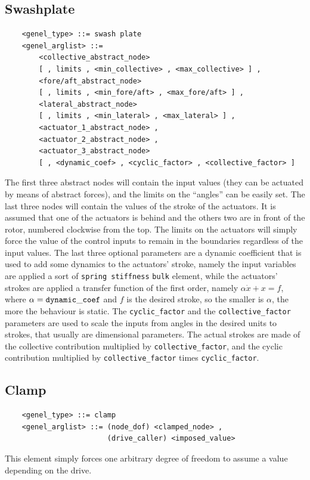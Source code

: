 \documentclass[10pt,dvips]{report}
\begin{document}
\subsection{Swashplate}
\begin{verbatim}
    <genel_type> ::= swash plate
    <genel_arglist> ::=
        <collective_abstract_node> 
        [ , limits , <min_collective> , <max_collective> ] ,
        <fore/aft_abstract_node> 
        [ , limits , <min_fore/aft> , <max_fore/aft> ] ,
        <lateral_abstract_node> 
        [ , limits , <min_lateral> , <max_lateral> ] ,
        <actuator_1_abstract_node> ,
        <actuator_2_abstract_node> ,
        <actuator_3_abstract_node> 
        [ , <dynamic_coef> , <cyclic_factor> , <collective_factor> ]
\end{verbatim}
The first three abstract nodes will contain the input values (they can be
actuated by means of abstract forces), and the limits on the ``angles'' can
be easily set. 
The last three nodes will contain the values of the stroke of the actuators.
It is assumed that one of the actuators is behind and the others two are in
front of the rotor, numbered clockwise from the top. 
The limits on the actuators will simply force the value of the control
inputs to remain in the boundaries regardless of the input values.
The last three optional parameters are a dynamic coefficient that is used to
add some dynamics to the actuators' stroke, namely the input variables are
applied a sort of {\tt spring stiffness} {\tt bulk} element, while the
actuators' strokes are applied a transfer function of the first order, namely
$ \alpha\dot{x}+x=f $, where $ \alpha={\tt dynamic\_coef} $ and $ f $ is
the desired stroke, so the smaller is $ \alpha $, the more the behaviour is
static.
The {\tt cyclic\_factor} and the {\tt collective\_factor} parameters are
used to scale the inputs from angles in the desired units to strokes, that
usually are dimensional parameters. The actual strokes are made of the
collective contribution multiplied by {\tt collective\_factor}, and the
cyclic contribution multiplied by {\tt collective\_factor} times 
{\tt cyclic\_factor}.
   
\subsection{Clamp}
\begin{verbatim}
    <genel_type> ::= clamp
    <genel_arglist> ::= (node_dof) <clamped_node> ,
                        (drive_caller) <imposed_value>
\end{verbatim}
This element simply forces one arbitrary degree of freedom to assume a value
depending on the drive.
\end{document}
